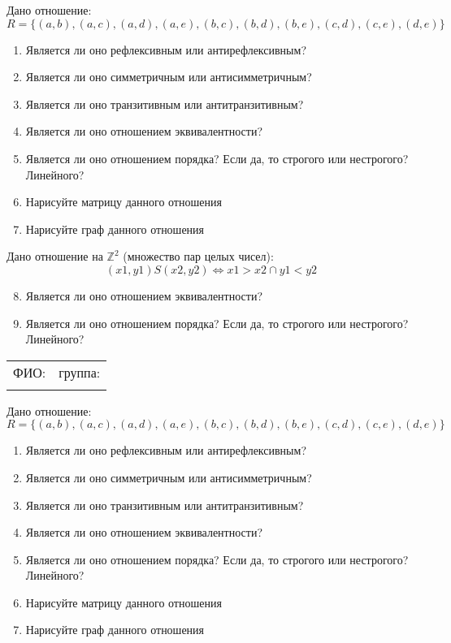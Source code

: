 \documentclass[russian,12pt]{article}
\begin{document}
\vspace{12pt}

Дано отношение:
$$R = \{(a, b), (a, c), (a, d), (a, e), (b, c), (b, d), (b, e), (c, d), (c, e), (d, e)\}$$
\begin{enumerate}
\item Является ли оно рефлексивным или антирефлексивным?
\item Является ли оно симметричным или антисимметричным?
\item Является ли оно транзитивным или антитранзитивным?
\item Является ли оно отношением эквивалентности?
\item Является ли оно отношением порядка? Если да, то строгого или нестрогого? Линейного?
\item Нарисуйте матрицу данного отношения
\item Нарисуйте граф данного отношения
\end{enumerate}

Дано отношение на $\mathbb{Z}^2$ (множество пар целых чисел):
$$(x1, y1)S(x2, y2) \iff x1 > x2 \cap y1 < y2$$
\begin{enumerate}
\setcounter{enumi}{7}
\item Является ли оно отношением эквивалентности?
\item Является ли оно отношением порядка? Если да, то строгого или нестрогого? Линейного?
\end{enumerate}
\newpage
\thispagestyle{empty}
\begin{tabular}{|p{}|p{}|}
\hline
ФИО: & группа: \\
 & \\ \hline
\end{tabular}

\vspace{12pt}

Дано отношение:
$$R = \{(a, b), (a, c), (a, d), (a, e), (b, c), (b, d), (b, e), (c, d), (c, e), (d, e)\}$$
\begin{enumerate}
\item Является ли оно рефлексивным или антирефлексивным?
\item Является ли оно симметричным или антисимметричным?
\item Является ли оно транзитивным или антитранзитивным?
\item Является ли оно отношением эквивалентности?
\item Является ли оно отношением порядка? Если да, то строгого или нестрогого? Линейного?
\item Нарисуйте матрицу данного отношения
\item Нарисуйте граф данного отношения
\end{enumerate}
\end{document}
